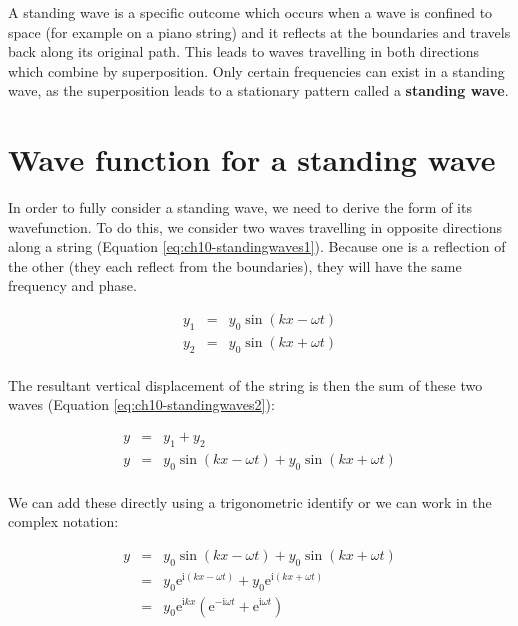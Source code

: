 \documentclass[
]{book}
\begin{document}
A standing wave is a specific outcome which occurs when a wave is confined to space (for example on a piano string) and it reflects at the boundaries and travels back along its original path. This leads to waves travelling in both directions which combine by superposition. Only certain frequencies can exist in a standing wave, as the superposition leads to a stationary pattern called a \textbf{standing wave}.

\hypertarget{sec:ch10-standingwaves2}{%
\section{Wave function for a standing wave}\label{sec:ch10-standingwaves2}}

In order to fully consider a standing wave, we need to derive the form of its wavefunction. To do this, we consider two waves travelling in opposite directions along a string (Equation \eqref{eq:ch10-standingwaves1}). Because one is a reflection of the other (they each reflect from the boundaries), they will have the same frequency and phase.

\begin{equation}
\begin{array}{rcl}
y_1 &=& y_0 \sin (kx - \omega t) \\
y_2 &=& y_0 \sin (kx + \omega t) \\
\end{array}
\label{eq:ch10-standingwaves1}
\end{equation}

The resultant vertical displacement of the string is then the sum of these two waves (Equation \eqref{eq:ch10-standingwaves2}):

\begin{equation}
\begin{array}{rcl}
y &=& y_1 + y_2 \\
y &=& y_0 \sin (kx - \omega t) + y_0 \sin (kx + \omega t) \\
\end{array}
\label{eq:ch10-standingwaves2}
\end{equation}

We can add these directly using a trigonometric identify or we can work in the complex notation:

\begin{equation}
\begin{array}{rcl}
y &=& y_0 \sin (kx - \omega t) + y_0 \sin (kx + \omega t) \\
 &=& y_0 \mathrm{e}^{\mathrm{i}(kx - \omega t)} + y_0 \mathrm{e}^{\mathrm{i}(kx + \omega t)} \\
 &=& y_0 \mathrm{e}^{\mathrm{i}kx} \left( \mathrm{e}^{-\mathrm{i}\omega t} + \mathrm{e}^{\mathrm{i}\omega t} \right)
\end{array}
\label{eq:ch10-standingwaves3}
\end{equation}
\end{document}
